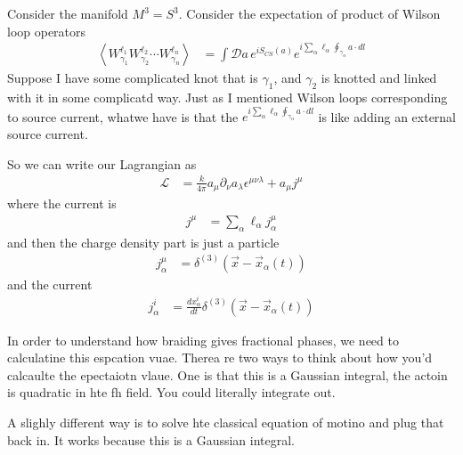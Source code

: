 Consider the manifold $M^3 = S^3$.
Consider the expectation of product of Wilson loop operators
\begin{align}
    \left\langle
    W_{\gamma_1}^{\ell_1}
    W_{\gamma_2}^{\ell_2}
    \cdots
    W_{\gamma_n}^{\ell_n}
    \right\rangle
    &=
    \int \mathcal{D} a\,
    e^{i S_{CS}(a)}
    e^{i
    \sum_\alpha \ell_\alpha \oint_{\gamma_\alpha} a\cdot dl
    }
\end{align}
Suppose I have some complicated knot that is $\gamma_1$,
and $\gamma_2$ is knotted and linked with it in some complicatd way.
Just as I mentioned Wilson loops corresponding to source current,
whatwe have is that the 
$ e^{i \sum_\alpha \ell_\alpha \oint_{\gamma_\alpha} a\cdot dl }$
is like adding an external source current.

So we can write our Lagrangian as
\begin{align}
    \mathcal{L} &=
    \frac{k}{4\pi} a_\mu \partial_\nu a_\lambda \epsilon^{\mu\nu\lambda}
    +
    a_\mu j^\mu
\end{align}
where the current is
\begin{align}
    j^\mu &=
    \sum_{\alpha} \ell_\alpha j_{\alpha}^{\mu}
\end{align}
and then the charge density part is just a particle
\begin{align}
    j_{\alpha}^{\mu}
    &=
    \delta^{(3)}\left( 
    \vec{x} - \vec{x}_{\alpha}(t)
    \right)
\end{align}
and the current
\begin{align}
    j_\alpha^i
    &=
    \frac{dx_\alpha^i}{dt}
    \delta^{(3)}\left( 
    \vec{x} - \vec{x}_{\alpha}(t)
    \right)
\end{align}

In order to understand how braiding gives fractional phases,
we need to calculatine this espcation vuae.
Therea re two ways to think about how you'd calcaulte the epectaiotn vlaue.
One is that this is a Gaussian integral,
the actoin is quadratic in hte fh field.
You could literally integrate out.

A slighly different way is to solve hte classical equation of motino
and plug that back in.
It works because this is a Gaussian integral.

